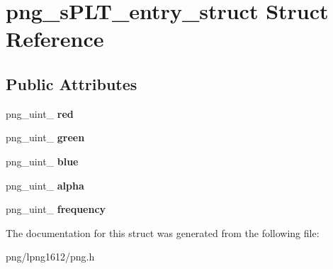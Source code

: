 \hypertarget{structpng__s_p_l_t__entry__struct}{\section{png\+\_\+s\+P\+L\+T\+\_\+entry\+\_\+struct Struct Reference}
\label{structpng__s_p_l_t__entry__struct}
}
\subsection*{Public Attributes}
\begin{DoxyCompactItemize}
\item 
\hypertarget{structpng__s_p_l_t__entry__struct_a05ba3cef8aa2c43d1f52c0300c525fd9}{png\+\_\+uint\+\_ {\bfseries red}}\label{structpng__s_p_l_t__entry__struct_a05ba3cef8aa2c43d1f52c0300c525fd9}

\item 
\hypertarget{structpng__s_p_l_t__entry__struct_a3b4269fb63b4087bd618a6741b805554}{png\+\_\+uint\+\_ {\bfseries green}}\label{structpng__s_p_l_t__entry__struct_a3b4269fb63b4087bd618a6741b805554}

\item 
\hypertarget{structpng__s_p_l_t__entry__struct_a2af6281d3b400362886a43977ebcb7db}{png\+\_\+uint\+\_ {\bfseries blue}}\label{structpng__s_p_l_t__entry__struct_a2af6281d3b400362886a43977ebcb7db}

\item 
\hypertarget{structpng__s_p_l_t__entry__struct_abea98962a064e2a05f460b9f2ea2f47b}{png\+\_\+uint\+\_ {\bfseries alpha}}\label{structpng__s_p_l_t__entry__struct_abea98962a064e2a05f460b9f2ea2f47b}

\item 
\hypertarget{structpng__s_p_l_t__entry__struct_ad8095a15bb5a054c12ef911478c5f3a3}{png\+\_\+uint\+\_ {\bfseries frequency}}\label{structpng__s_p_l_t__entry__struct_ad8095a15bb5a054c12ef911478c5f3a3}

\end{DoxyCompactItemize}


The documentation for this struct was generated from the following file\+:\begin{DoxyCompactItemize}
\item 
png/lpng1612/png.\+h\end{DoxyCompactItemize}
